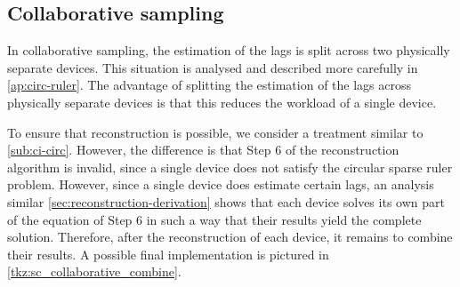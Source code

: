 \documentclass[a4paper, openany, oneside]{memoir}
\begin{document}
\subsection{Collaborative sampling}
In collaborative sampling, the estimation of the lags is split across two physically separate devices. This situation is analysed and described more carefully in \cref{ap:circ-ruler}. The advantage of splitting the estimation of the lags across physically separate devices is that this reduces the workload of a single device. 

To ensure that reconstruction is possible, we consider a treatment similar to \cref{sub:ci-circ}. However, the difference is that Step 6 of the reconstruction algorithm is invalid, since a single device does not satisfy the circular sparse ruler problem. However, since a single device does estimate certain lags, an analysis similar \cref{sec:reconstruction-derivation} shows that each device solves its own part of the equation of Step 6 in such a way that their results yield the complete solution. Therefore, after the reconstruction of each device, it remains to combine their results. A possible final implementation is pictured in \cref{tkz:sc_collaborative_combine}.
\end{document}
